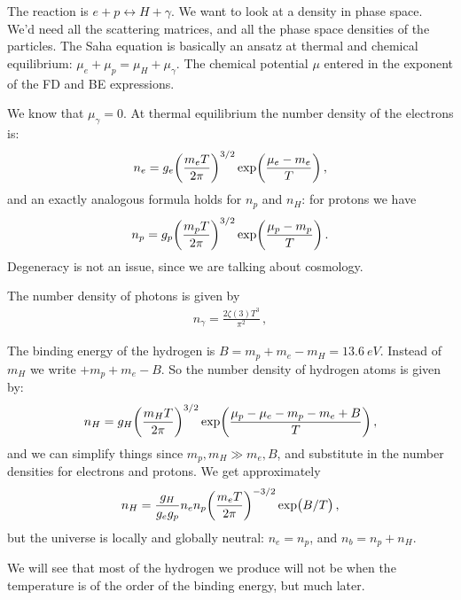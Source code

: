 \documentclass[main.tex]{subfiles}
\begin{document}
The reaction is \(e + p \leftrightarrow H + \gamma \). We want to look at a density in phase space.
We'd need all the scattering matrices, and all the phase space densities of the particles.
The Saha equation is basically an ansatz at thermal and chemical equilibrium: \(\mu _e + \mu_p = \mu_H + \mu_\gamma \). The chemical potential \(\mu \) entered in the exponent of the FD and BE expressions.

We know that \(\mu_{\gamma }=0\).
At thermal equilibrium the number density of the electrons is: 
%
\begin{align}
  n_e = g_e \qty(\frac{m_e T}{2 \pi })^{3/2} \exp(\frac{\mu _e - m_e }{T}) 
\,,
\end{align}
%
and an exactly analogous formula holds for \(n_p\) and \(n_H\): for protons we have 
%
\begin{align}
    n_p = g_p \qty(\frac{m_p T}{2 \pi })^{3/2} \exp(\frac{\mu _p - m_p }{T}) 
  \,.
\end{align}
Degeneracy is not an issue, since we are talking about cosmology.

The number density of photons is given by 
%
\begin{align} \label{eq:n-gamma}
  n_{\gamma } = \frac{2 \zeta (3) T^3}{\pi^2}
\,,
\end{align}
%

The binding energy of the hydrogen is \(B=m_p+m_e-m_H=\SI{13.6}{eV}\). Instead of \(m_H\) we write \(+m_p+m_e-B\). So the number density of hydrogen atoms is given by: 
%
\begin{align}
  n_H = g_H \qty(\frac{m_H T}{2 \pi })^{3/2} \exp(\frac{\mu_p - \mu_e - m_p - m_e + B}{T})
\,,
\end{align}
%
and we can simplify things since \(m_p, m_H \gg m_e, B\), and substitute in the number densities for electrons and protons.
We get approximately
%
\begin{align}
  n_H = \frac{g_H}{g_e g_p} n_e n_p \qty(\frac{m_e T}{2 \pi })^{-3/2}\exp(B/T)
\,,
\end{align}
%
but the universe is locally and globally neutral: \(n_e = n_p\), and \(n_b = n_p + n_H\). 

We will see that most of the hydrogen we produce will not be when the temperature is of the order of the binding energy, but much later.
\end{document}
